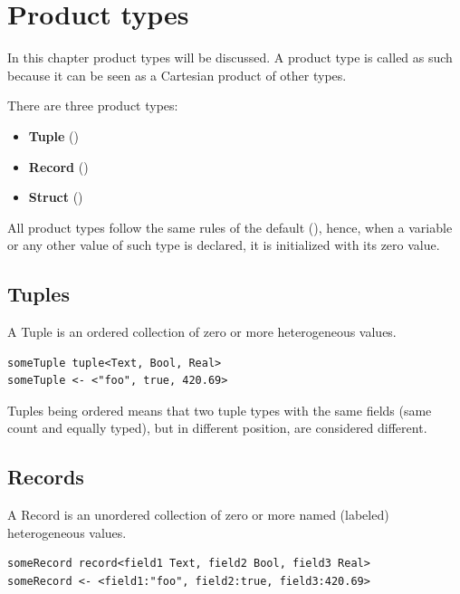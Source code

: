 \chapter{Product types}

In this chapter product types will be discussed. A product type is called as
such because it can be seen as a Cartesian product of other types.

There are three product types:
\begin{itemize}
	\item \textbf{Tuple} ()
	\item \textbf{Record} ()
	\item \textbf{Struct} ()
\end{itemize}

All product types follow the same rules of the default (),
hence, when a variable or any other value of such type is declared, it is
initialized with its zero value.\footnotemark[1]


\section{Tuples}
\label{sec:tuples}

A Tuple is an ordered collection of zero or more heterogeneous values.

\begin{verbatim}
someTuple tuple<Text, Bool, Real>
someTuple <- <"foo", true, 420.69>
\end{verbatim}

Tuples being ordered means that two tuple types with the same fields (same
count and equally typed), but in different position, are considered different.

\section{Records}
\label{sec:records}

A Record is an unordered collection of zero or more named (labeled)
heterogeneous values.

\begin{verbatim}
someRecord record<field1 Text, field2 Bool, field3 Real>
someRecord <- <field1:"foo", field2:true, field3:420.69>
\end{verbatim}

